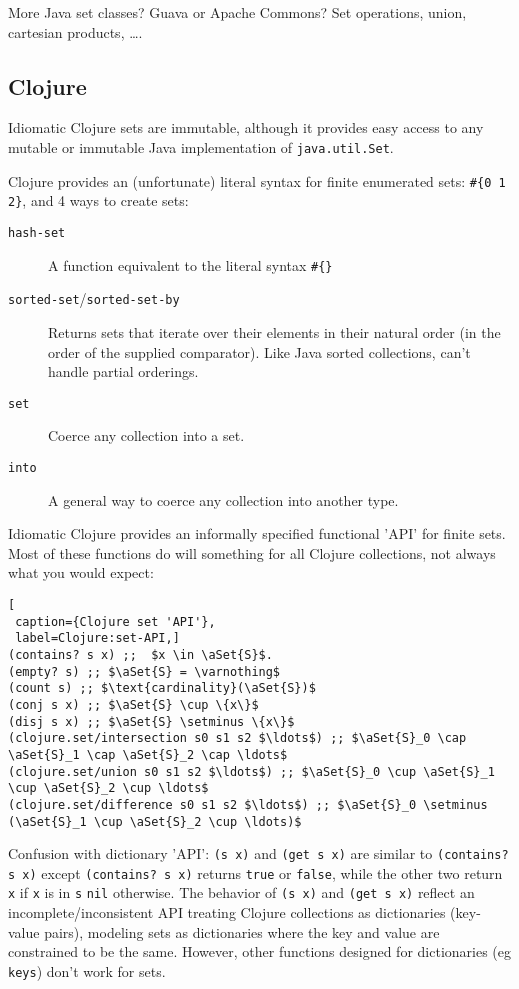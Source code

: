 More Java set classes? Guava or Apache Commons?
Set operations, union, cartesian products, \ldots.

\subsection{Clojure}
\lstset{language=Clojure}

Idiomatic Clojure sets are immutable, although it provides easy
access to any mutable or immutable Java implementation of
\lstinline|java.util.Set|.

Clojure provides an (unfortunate) literal syntax for finite
enumerated sets: 
\lstinline|#{0 1 2}|, and 4 ways to create sets:
\begin{description}
\item[\texttt{hash-set}] A function equivalent to the
literal syntax \lstinline|#{}|
\item[\texttt{sorted-set}/\texttt{sorted-set-by}] Returns
sets that iterate over their elements in their natural order (in the
order of the supplied comparator). Like Java sorted collections,
can't handle partial orderings.
\item[\texttt{set}] Coerce any collection into a set.
\item[\texttt{into}] A general way to coerce any collection
into another type.
\end{description}

Idiomatic Clojure provides an informally specified functional
'API' for finite sets. Most of these functions do will something
for all Clojure collections, not always what you would expect:
\begin{lstlisting}[
 caption={Clojure set 'API'}, 
 label=Clojure:set-API,]
(contains? s x) ;;  $x \in \aSet{S}$.
(empty? s) ;; $\aSet{S} = \varnothing$
(count s) ;; $\text{cardinality}(\aSet{S})$
(conj s x) ;; $\aSet{S} \cup \{x\}$
(disj s x) ;; $\aSet{S} \setminus \{x\}$
(clojure.set/intersection s0 s1 s2 $\ldots$) ;; $\aSet{S}_0 \cap \aSet{S}_1 \cap \aSet{S}_2 \cap \ldots$ 
(clojure.set/union s0 s1 s2 $\ldots$) ;; $\aSet{S}_0 \cup \aSet{S}_1 \cup \aSet{S}_2 \cup \ldots$ 
(clojure.set/difference s0 s1 s2 $\ldots$) ;; $\aSet{S}_0 \setminus (\aSet{S}_1 \cup \aSet{S}_2 \cup \ldots)$
\end{lstlisting}

Confusion with dictionary 'API':
 \lstinline|(s x)| and \lstinline|(get s x)| are similar to
 \lstinline|(contains? s x)| except \lstinline|(contains? s x)| returns
 \lstinline|true| or \lstinline|false|, while the other two return
 \lstinline|x| if \lstinline|x| is in \lstinline|s| \lstinline|nil| otherwise.
The behavior of \lstinline|(s x)| and \lstinline|(get s x)| reflect an
incomplete/inconsistent API treating Clojure collections as
dictionaries (key-value pairs), modeling sets as dictionaries
where the key and value are constrained to be the same.
However, other functions designed for dictionaries (eg
\lstinline|keys|) don't work for sets.
 
